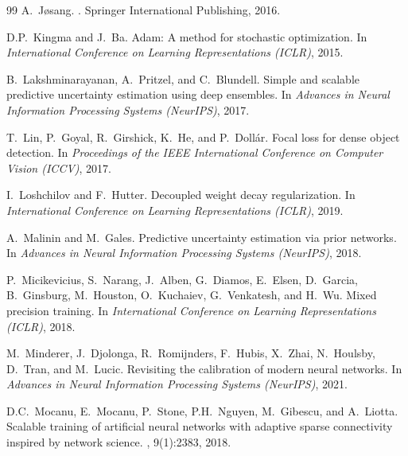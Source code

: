 \documentclass[letterpaper]{article} %
\begin{document}
\begin{thebibliography}{99}
A.~J{\o}sang.
.
\newblock Springer International Publishing, 2016.

D.P.~Kingma and J.~Ba.
\newblock Adam: A method for stochastic optimization.
\newblock In {\em International Conference on Learning Representations (ICLR)}, 2015.

B.~Lakshminarayanan, A.~Pritzel, and C.~Blundell.
\newblock Simple and scalable predictive uncertainty estimation using deep ensembles.
\newblock In {\em Advances in Neural Information Processing Systems (NeurIPS)}, 2017.

T.~Lin, P.~Goyal, R.~Girshick, K.~He, and P.~Doll{\'a}r.
\newblock Focal loss for dense object detection.
\newblock In {\em Proceedings of the IEEE International Conference on Computer Vision (ICCV)}, 2017.

I.~Loshchilov and F.~Hutter.
\newblock Decoupled weight decay regularization.
\newblock In {\em International Conference on Learning Representations (ICLR)}, 2019.

A.~Malinin and M.~Gales.
\newblock Predictive uncertainty estimation via prior networks.
\newblock In {\em Advances in Neural Information Processing Systems (NeurIPS)}, 2018.

P.~Micikevicius, S.~Narang, J.~Alben, G.~Diamos, E.~Elsen, D.~Garcia, B.~Ginsburg, M.~Houston, O.~Kuchaiev, G.~Venkatesh, and H.~Wu.
\newblock Mixed precision training.
\newblock In {\em International Conference on Learning Representations (ICLR)}, 2018.

M.~Minderer, J.~Djolonga, R.~Romijnders, F.~Hubis, X.~Zhai, N.~Houlsby, D.~Tran, and M.~Lucic.
\newblock Revisiting the calibration of modern neural networks.
\newblock In {\em Advances in Neural Information Processing Systems (NeurIPS)}, 2021.

D.C.~Mocanu, E.~Mocanu, P.~Stone, P.H.~Nguyen, M.~Gibescu, and A.~Liotta.
\newblock Scalable training of artificial neural networks with adaptive sparse connectivity inspired by network science.
, 9(1):2383, 2018.


\end{thebibliography}
\end{document}
